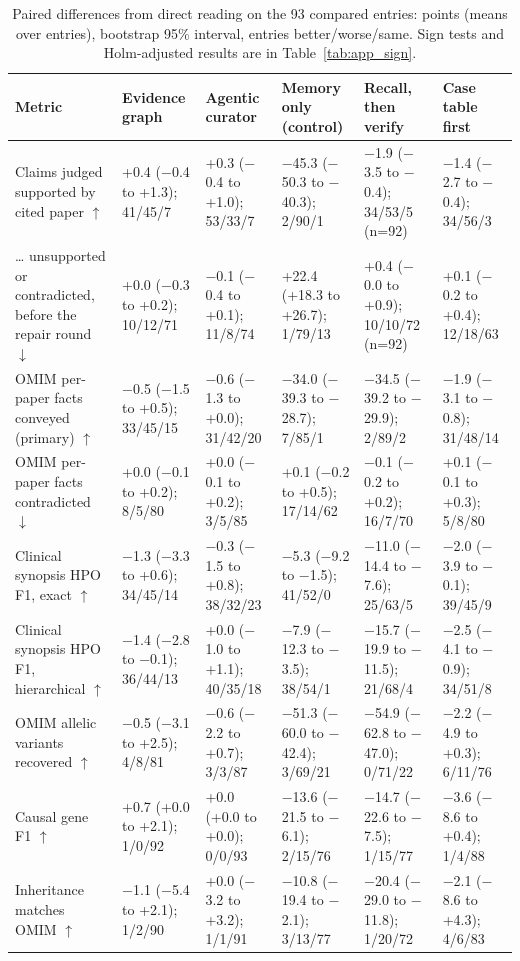 \documentclass{article} %
\begin{document}
\begin{table}[!htbp]
\caption{Paired differences from direct reading on the 93 compared entries: points (means over entries), bootstrap 95\% interval, entries better/worse/same. Sign tests and Holm-adjusted results are in Table~\ref{tab:app_sign}.}
\label{tab:app_paired}
\scriptsize
\begin{tabularx}{\linewidth}{>{\raggedright\arraybackslash}p{3.0cm}>{\centering\arraybackslash}X>{\centering\arraybackslash}X>{\centering\arraybackslash}X>{\centering\arraybackslash}X>{\centering\arraybackslash}X}
\toprule
Metric & Evidence graph & Agentic curator & Memory only (control) & Recall, then verify & Case table first \\
\midrule
Claims judged supported by cited paper $\uparrow$ & +0.4 ($-$0.4 to +1.3); 41/45/7 & +0.3 ($-$0.4 to +1.0); 53/33/7 & $-$45.3 ($-$50.3 to $-$40.3); 2/90/1 & $-$1.9 ($-$3.5 to $-$0.4); 34/53/5 (n=92) & $-$1.4 ($-$2.7 to $-$0.4); 34/56/3 \\
\ldots{} unsupported or contradicted, before the repair round $\downarrow$ & +0.0 ($-$0.3 to +0.2); 10/12/71 & $-$0.1 ($-$0.4 to +0.1); 11/8/74 & +22.4 (+18.3 to +26.7); 1/79/13 & +0.4 ($-$0.0 to +0.9); 10/10/72 (n=92) & +0.1 ($-$0.2 to +0.4); 12/18/63 \\
OMIM per-paper facts conveyed (primary) $\uparrow$ & $-$0.5 ($-$1.5 to +0.5); 33/45/15 & $-$0.6 ($-$1.3 to +0.0); 31/42/20 & $-$34.0 ($-$39.3 to $-$28.7); 7/85/1 & $-$34.5 ($-$39.2 to $-$29.9); 2/89/2 & $-$1.9 ($-$3.1 to $-$0.8); 31/48/14 \\
OMIM per-paper facts contradicted $\downarrow$ & +0.0 ($-$0.1 to +0.2); 8/5/80 & +0.0 ($-$0.1 to +0.2); 3/5/85 & +0.1 ($-$0.2 to +0.5); 17/14/62 & $-$0.1 ($-$0.2 to +0.2); 16/7/70 & +0.1 ($-$0.1 to +0.3); 5/8/80 \\
Clinical synopsis HPO F1, exact $\uparrow$ & $-$1.3 ($-$3.3 to +0.6); 34/45/14 & $-$0.3 ($-$1.5 to +0.8); 38/32/23 & $-$5.3 ($-$9.2 to $-$1.5); 41/52/0 & $-$11.0 ($-$14.4 to $-$7.6); 25/63/5 & $-$2.0 ($-$3.9 to $-$0.1); 39/45/9 \\
Clinical synopsis HPO F1, hierarchical $\uparrow$ & $-$1.4 ($-$2.8 to $-$0.1); 36/44/13 & +0.0 ($-$1.0 to +1.1); 40/35/18 & $-$7.9 ($-$12.3 to $-$3.5); 38/54/1 & $-$15.7 ($-$19.9 to $-$11.5); 21/68/4 & $-$2.5 ($-$4.1 to $-$0.9); 34/51/8 \\
OMIM allelic variants recovered $\uparrow$ & $-$0.5 ($-$3.1 to +2.5); 4/8/81 & $-$0.6 ($-$2.2 to +0.7); 3/3/87 & $-$51.3 ($-$60.0 to $-$42.4); 3/69/21 & $-$54.9 ($-$62.8 to $-$47.0); 0/71/22 & $-$2.2 ($-$4.9 to +0.3); 6/11/76 \\
Causal gene F1 $\uparrow$ & +0.7 (+0.0 to +2.1); 1/0/92 & +0.0 (+0.0 to +0.0); 0/0/93 & $-$13.6 ($-$21.5 to $-$6.1); 2/15/76 & $-$14.7 ($-$22.6 to $-$7.5); 1/15/77 & $-$3.6 ($-$8.6 to +0.4); 1/4/88 \\
Inheritance matches OMIM $\uparrow$ & $-$1.1 ($-$5.4 to +2.1); 1/2/90 & +0.0 ($-$3.2 to +3.2); 1/1/91 & $-$10.8 ($-$19.4 to $-$2.1); 3/13/77 & $-$20.4 ($-$29.0 to $-$11.8); 1/20/72 & $-$2.1 ($-$8.6 to +4.3); 4/6/83 \\
\bottomrule
\end{tabularx}
\end{table}
\end{document}
